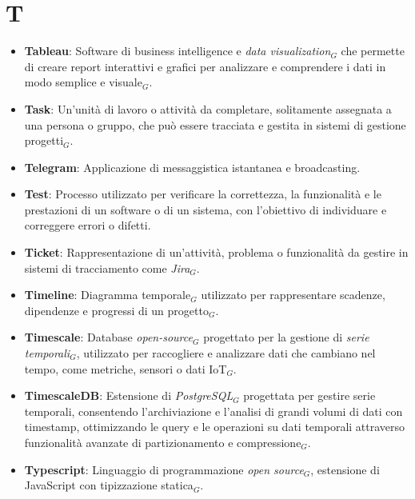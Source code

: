 \section{T}
\begin{itemize}
    \item \textbf{Tableau}: Software di business intelligence e \textit{data visualization}$_G$ che permette di creare report interattivi e grafici per analizzare e comprendere i dati in modo semplice e visuale$_G$.
    \item \textbf{Task}: Un'unità di lavoro o attività da completare, solitamente assegnata a una persona o gruppo, che può essere tracciata e gestita in sistemi di gestione progetti$_G$.
    \item \textbf{Telegram}: Applicazione di messaggistica istantanea e broadcasting.
    \item \textbf{Test}: Processo utilizzato per verificare la correttezza, la funzionalità e le prestazioni di un software o di un sistema, con l'obiettivo di individuare e correggere errori o difetti.
    \item \textbf{Ticket}: Rappresentazione di un’attività, problema o funzionalità da gestire in sistemi di tracciamento come \textit{Jira}$_G$.
    \item \textbf{Timeline}: Diagramma temporale$_G$ utilizzato per rappresentare scadenze, dipendenze e progressi di un progetto$_G$.
    \item \textbf{Timescale}: Database \textit{open-source}$_G$ progettato per la gestione di \textit{serie temporali}$_G$, utilizzato per raccogliere e analizzare dati che cambiano nel tempo, come metriche, sensori o dati IoT$_G$.
    \item \textbf{TimescaleDB}: Estensione di \textit{PostgreSQL}$_G$ progettata per gestire serie temporali, consentendo l'archiviazione e l'analisi di grandi volumi di dati con timestamp, ottimizzando le query e le operazioni su dati temporali attraverso funzionalità avanzate di partizionamento e compressione$_G$.
    \item \textbf{Typescript}: Linguaggio di programmazione \textit{open source}$_G$, estensione di JavaScript con tipizzazione statica$_G$.
\end{itemize}
